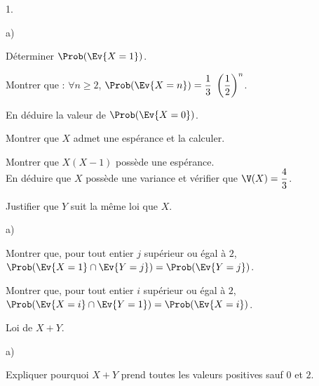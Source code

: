 \begin{noliste}{1.}
  \setlength{\itemsep}{4mm}
\item
  \begin{noliste}{a)}
    \setlength{\itemsep}{2mm}
  \item Déterminer $\Prob(\Ev{X = 1})$.

    
    



  \item Montrer que : $\forall n \geq 2$, $\Prob(\Ev{X = n}) =
    \dfrac{1}{3} \ \left( \dfrac{1}{2} \right)^n$.

    



    
  \item En déduire la valeur de $\Prob(\Ev{X = 0})$.

    
  \end{noliste}

\item Montrer que $X$ admet une espérance et la calculer.

  

\item Montrer que $X (X-1)$ possède une espérance. \\
  En déduire que $X$ possède une variance et vérifier que $\V(X) =
  \dfrac{4}{3}$.

  

\item Justifier que $Y$ suit la même loi que $X$.

  

\item
  \begin{noliste}{a)}
    \setlength{\itemsep}{2mm}
  \item Montrer que, pour tout entier $j$ supérieur ou égal à $2$,
    $\Prob(\Ev{X = 1} \cap \Ev{Y = j}) = \Prob(\Ev{Y = j})$.

    

  \item Montrer que, pour tout entier $i$ supérieur ou égal à $2$,
    $\Prob(\Ev{X = i} \cap \Ev{Y = 1}) = \Prob(\Ev{X = i})$.

    
  \end{noliste}

\item Loi de $X + Y$.
  \begin{noliste}{a)}
    \setlength{\itemsep}{2mm}
  \item Expliquer pourquoi $X + Y$ prend toutes les valeurs positives
    sauf $0$ et $2$.


\end{noliste}
\end{noliste}
